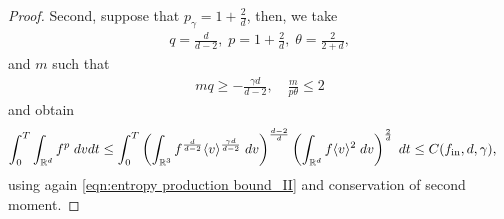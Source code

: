 \documentclass[12pt,american]{amsart}
\numberwithin{equation}{section}
\theoremstyle{plain}
\theoremstyle{definition}                  %
\def\fin{f_{\textnormal{in}}}
\begin{document}
\begin{proof}
  Second, suppose that  $p_\gamma = 1+\frac{2}{d}$, then, we take
  \begin{align*}
    q = \frac{d}{d-2}, \; p = 1+\frac{2}{d},\; \theta = \frac{2}{2+d},
  \end{align*}
  and $m$ such that 
  \begin{align*}
    mq \ge -\frac{\gamma d}{d-2},\quad \frac{m}{p\theta} \leq 2
  \end{align*}	
  and obtain 
  \begin{align*}
    \int_0^T  \int_{\mathbb{R}^d} f^p\;dvdt  & \le  \int_0^T\left(\int_{\mathbb{R}^3} f^{\frac{d}{d-2}}\langle v \rangle^{{\frac{\gamma d}{d-2}}}\;dv\right)^{\frac{d-2}{d}}\left(\int_{\mathbb{R}^d} f\langle v \rangle^{2}\;dv\right)^{\frac{2}{d}}\;dt  \leq  C(\fin,d,\gamma),
  \end{align*}
 using again \eqref{eqn:entropy production bound_II} and conservation of second moment.    
    
\end{proof}	  
  
  
\end{document}
